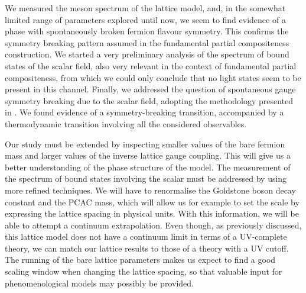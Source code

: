 We measured the meson spectrum of the lattice model, and, in the somewhat limited range of parameters explored until now, we seem to find evidence of a phase with spontaneously broken fermion flavour symmetry. This confirms the symmetry breaking pattern assumed in the fundamental partial compositeness construction. We started a very preliminary analysis of the spectrum of bound states of the scalar field, also very relevant in the context of fundamental partial compositeness, from which we could only conclude that no light states seem to be present in this channel. Finally, we addressed the question of spontaneous gauge symmetry breaking due to the scalar field, adopting the methodology presented in \cite{Caudy:2007sf}. We found evidence of a symmetry-breaking transition, accompanied by a thermodynamic transition involving all the considered observables.

Our study must be extended by inspecting smaller values of the bare fermion mass and larger values of the inverse lattice gauge coupling. This will give us a better understanding of the phase structure of the model. The measurement of the spectrum of bound states involving the scalar must be addressed by using more refined techniques. We will have to renormalise the Goldstone boson decay constant and the PCAC mass, which will allow us for example to set the scale by expressing the lattice spacing in physical units. With this information, we will be able to attempt a continuum extrapolation. Even though, as previously discussed, this lattice model does not have a continuum limit in terms of a UV-complete theory, we can match our lattice results to those of a theory with a UV cutoff. The running of the bare lattice parameters makes us expect to find a good scaling window when changing the lattice spacing, so that valuable input for phenomenological models may possibly be provided. 



